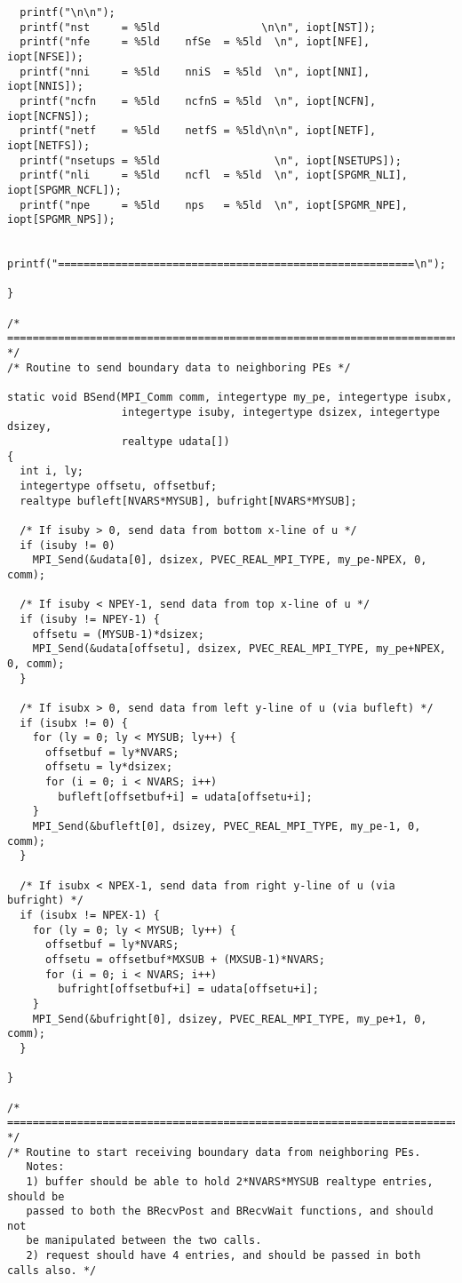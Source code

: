 \begin{verbatim}
  printf("\n\n");
  printf("nst     = %5ld                \n\n", iopt[NST]);
  printf("nfe     = %5ld    nfSe  = %5ld  \n", iopt[NFE],  iopt[NFSE]);
  printf("nni     = %5ld    nniS  = %5ld  \n", iopt[NNI],  iopt[NNIS]);
  printf("ncfn    = %5ld    ncfnS = %5ld  \n", iopt[NCFN], iopt[NCFNS]);
  printf("netf    = %5ld    netfS = %5ld\n\n", iopt[NETF], iopt[NETFS]);
  printf("nsetups = %5ld                  \n", iopt[NSETUPS]);
  printf("nli     = %5ld    ncfl  = %5ld  \n", iopt[SPGMR_NLI], iopt[SPGMR_NCFL]);
  printf("npe     = %5ld    nps   = %5ld  \n", iopt[SPGMR_NPE], iopt[SPGMR_NPS]);

  printf("========================================================\n");

}

/* ======================================================================= */
/* Routine to send boundary data to neighboring PEs */

static void BSend(MPI_Comm comm, integertype my_pe, integertype isubx, 
                  integertype isuby, integertype dsizex, integertype dsizey, 
                  realtype udata[])
{
  int i, ly;
  integertype offsetu, offsetbuf;
  realtype bufleft[NVARS*MYSUB], bufright[NVARS*MYSUB];

  /* If isuby > 0, send data from bottom x-line of u */
  if (isuby != 0)
    MPI_Send(&udata[0], dsizex, PVEC_REAL_MPI_TYPE, my_pe-NPEX, 0, comm);

  /* If isuby < NPEY-1, send data from top x-line of u */
  if (isuby != NPEY-1) {
    offsetu = (MYSUB-1)*dsizex;
    MPI_Send(&udata[offsetu], dsizex, PVEC_REAL_MPI_TYPE, my_pe+NPEX, 0, comm);
  }

  /* If isubx > 0, send data from left y-line of u (via bufleft) */
  if (isubx != 0) {
    for (ly = 0; ly < MYSUB; ly++) {
      offsetbuf = ly*NVARS;
      offsetu = ly*dsizex;
      for (i = 0; i < NVARS; i++)
        bufleft[offsetbuf+i] = udata[offsetu+i];
    }
    MPI_Send(&bufleft[0], dsizey, PVEC_REAL_MPI_TYPE, my_pe-1, 0, comm);   
  }

  /* If isubx < NPEX-1, send data from right y-line of u (via bufright) */
  if (isubx != NPEX-1) {
    for (ly = 0; ly < MYSUB; ly++) {
      offsetbuf = ly*NVARS;
      offsetu = offsetbuf*MXSUB + (MXSUB-1)*NVARS;
      for (i = 0; i < NVARS; i++)
        bufright[offsetbuf+i] = udata[offsetu+i];
    }
    MPI_Send(&bufright[0], dsizey, PVEC_REAL_MPI_TYPE, my_pe+1, 0, comm);   
  }

}
 
/* ======================================================================= */
/* Routine to start receiving boundary data from neighboring PEs.
   Notes:
   1) buffer should be able to hold 2*NVARS*MYSUB realtype entries, should be
   passed to both the BRecvPost and BRecvWait functions, and should not
   be manipulated between the two calls.
   2) request should have 4 entries, and should be passed in both calls also. */


\end{verbatim}
